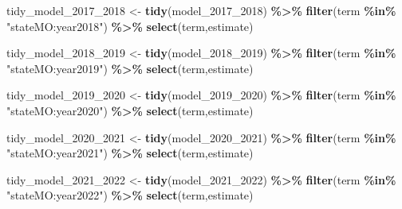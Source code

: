 \documentclass[
]{article}
\newenvironment{Shaded}{\begin{snugshade}}{\end{snugshade}}
\newcommand{\FunctionTok}[1]{\textcolor[rgb]{0.13,0.29,0.53}{\textbf{#1}}}
\newcommand{\NormalTok}[1]{#1}
\newcommand{\OtherTok}[1]{\textcolor[rgb]{0.56,0.35,0.01}{#1}}
\newcommand{\SpecialCharTok}[1]{\textcolor[rgb]{0.81,0.36,0.00}{\textbf{#1}}}
\newcommand{\StringTok}[1]{\textcolor[rgb]{0.31,0.60,0.02}{#1}}
\begin{document}
\begin{Shaded}
\begin{Highlighting}[]
\NormalTok{tidy\_model\_2017\_2018 }\OtherTok{\textless{}{-}} \FunctionTok{tidy}\NormalTok{(model\_2017\_2018) }\SpecialCharTok{\%\textgreater{}\%}
  \FunctionTok{filter}\NormalTok{(term }\SpecialCharTok{\%in\%} \StringTok{"stateMO:year2018"}\NormalTok{) }\SpecialCharTok{\%\textgreater{}\%}
           \FunctionTok{select}\NormalTok{(term,estimate)}

\NormalTok{tidy\_model\_2018\_2019 }\OtherTok{\textless{}{-}} \FunctionTok{tidy}\NormalTok{(model\_2018\_2019) }\SpecialCharTok{\%\textgreater{}\%}
  \FunctionTok{filter}\NormalTok{(term }\SpecialCharTok{\%in\%} \StringTok{"stateMO:year2019"}\NormalTok{) }\SpecialCharTok{\%\textgreater{}\%}
           \FunctionTok{select}\NormalTok{(term,estimate)}

\NormalTok{tidy\_model\_2019\_2020 }\OtherTok{\textless{}{-}} \FunctionTok{tidy}\NormalTok{(model\_2019\_2020) }\SpecialCharTok{\%\textgreater{}\%}
  \FunctionTok{filter}\NormalTok{(term }\SpecialCharTok{\%in\%} \StringTok{"stateMO:year2020"}\NormalTok{) }\SpecialCharTok{\%\textgreater{}\%}
           \FunctionTok{select}\NormalTok{(term,estimate)}

\NormalTok{tidy\_model\_2020\_2021 }\OtherTok{\textless{}{-}} \FunctionTok{tidy}\NormalTok{(model\_2020\_2021) }\SpecialCharTok{\%\textgreater{}\%}
  \FunctionTok{filter}\NormalTok{(term }\SpecialCharTok{\%in\%} \StringTok{"stateMO:year2021"}\NormalTok{) }\SpecialCharTok{\%\textgreater{}\%}
           \FunctionTok{select}\NormalTok{(term,estimate)}

\NormalTok{tidy\_model\_2021\_2022 }\OtherTok{\textless{}{-}} \FunctionTok{tidy}\NormalTok{(model\_2021\_2022) }\SpecialCharTok{\%\textgreater{}\%}
  \FunctionTok{filter}\NormalTok{(term }\SpecialCharTok{\%in\%} \StringTok{"stateMO:year2022"}\NormalTok{) }\SpecialCharTok{\%\textgreater{}\%}
           \FunctionTok{select}\NormalTok{(term,estimate)}
\end{Highlighting}
\end{Shaded}
\end{document}
